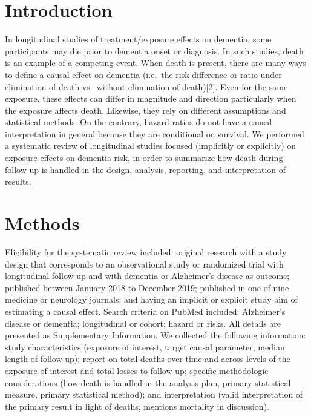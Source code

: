 \documentclass[
]{book}
\begin{document}
\newpage

\hypertarget{introduction-2}{%
\section{Introduction}\label{introduction-2}}

In longitudinal studies of treatment/exposure effects on dementia, some participants may die prior to dementia onset or diagnosis. In such studies, death is an example of a competing event\autocite{tsiatis1975,young2020}. When death is present, there are many ways to define a causal effect on dementia (i.e.~the risk difference or ratio under elimination of death vs.~without elimination of death){[}2{]}. Even for the same exposure, these effects can differ in magnitude and direction particularly when the exposure affects death. Likewise, they rely on different assumptions and statistical methods. On the contrary, hazard ratios do not have a causal interpretation in general because they are conditional on survival\autocite{young2020,hernan2010,stensrud2020,geskus2016}. We performed a systematic review of longitudinal studies focused (implicitly or explicitly) on exposure effects on dementia risk, in order to summarize how death during follow-up is handled in the design, analysis, reporting, and interpretation of results.

\hypertarget{methods-3}{%
\section{Methods}\label{methods-3}}

Eligibility for the systematic review included: original research with a study design that corresponds to an observational study or randomized trial with longitudinal follow-up and with dementia or Alzheimer's disease as outcome; published between January 2018 to December 2019; published in one of nine medicine or neurology journals; and having an implicit or explicit study aim of estimating a causal effect. Search criteria on PubMed included: Alzheimer's disease or dementia; longitudinal or cohort; hazard or risks. All details are presented as Supplementary Information. We collected the following information: study characteristics (exposure of interest, target causal parameter, median length of follow-up); report on total deaths over time and across levels of the exposure of interest and total losses to follow-up; specific methodologic considerations (how death is handled in the analysis plan, primary statistical measure, primary statistical method); and interpretation (valid interpretation of the primary result in light of deaths, mentions mortality in discussion).
\end{document}
